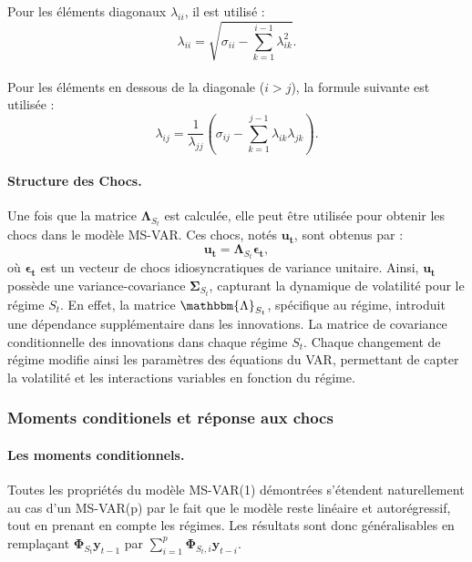 \begin{sloppypar}
Pour les éléments diagonaux $\lambda_{ii}$, il est utilisé :
\begin{equation}
    \lambda_{ii} = \sqrt{\sigma_{ii} - \sum_{k=1}^{i-1} \lambda_{ik}^2}.
\end{equation}
\\

Pour les éléments en dessous de la diagonale ($i > j$), la formule suivante est utilisée :
\begin{equation}
    \lambda_{ij} = \frac{1}{\lambda_{jj}} \left( \sigma_{ij} - \sum_{k=1}^{j-1} \lambda_{ik} \lambda_{jk} \right).
\end{equation}

\paragraph{Structure des Chocs.} Une fois que la matrice $\bm{\Lambda}_{S_t}$ est calculée, elle peut être utilisée pour obtenir les chocs dans le modèle MS-VAR. Ces chocs, notés $\bm{u_t}$, sont obtenus par :
\begin{equation}
    \bm{u_t} = \bm{\Lambda}_{S_t} \bm{\epsilon_t},
\end{equation}
où $\bm{\epsilon_t}$ est un vecteur de chocs idiosyncratiques de variance unitaire. Ainsi, $\bm{u_t}$ possède une variance-covariance $\bm{\Sigma}_{S_t}$, capturant la dynamique de volatilité pour le régime $S_t$. En effet, la matrice \( \mathbbm{\Lambda}_{S_t} \), spécifique au régime, introduit une dépendance supplémentaire dans les innovations. La matrice de covariance conditionnelle des innovations dans chaque régime \( S_t \). Chaque changement de régime modifie ainsi les paramètres des équations du VAR, permettant de capter la volatilité et les interactions variables en fonction du régime.

\subsubsection{Moments conditionels et réponse aux chocs}

\paragraph{Les moments conditionnels.} Toutes les propriétés du modèle MS-VAR(1) démontrées s’étendent naturellement au cas d'un MS-VAR(p) par le fait que le modèle reste linéaire et autorégressif, tout en prenant en compte les régimes. Les résultats sont donc généralisables en remplaçant $\bm\Phi_{S_{t}}\bm{y}_{t-1}$ par $\displaystyle{\sum_{i=1}^{p} \bm\Phi_{S_{t},i}}\bm{y}_{t-i}$.\\


\end{sloppypar}
